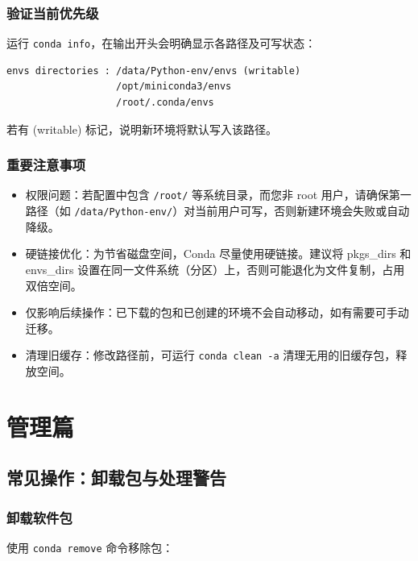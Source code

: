 \documentclass[12pt,UTF8]{ctexbook}
\begin{document}
\section{验证当前优先级}
\label{sec:verify_priority}

运行 \texttt{conda info}，在输出开头会明确显示各路径及可写状态：

\begin{lstlisting}
envs directories : /data/Python-env/envs (writable)
                   /opt/miniconda3/envs
                   /root/.conda/envs
\end{lstlisting}

若有 (writable) 标记，说明新环境将默认写入该路径。

\section{重要注意事项}
\label{sec:important_notes}

\begin{itemize}[leftmargin=2cm]
    \item 权限问题：若配置中包含 \texttt{/root/} 等系统目录，而您非 root 用户，请确保第一路径（如 \texttt{/data/Python-env/}）对当前用户可写，否则新建环境会失败或自动降级。
    \item 硬链接优化：为节省磁盘空间，Conda 尽量使用硬链接。建议将 pkgs\_dirs 和 envs\_dirs 设置在同一文件系统（分区）上，否则可能退化为文件复制，占用双倍空间。
    \item 仅影响后续操作：已下载的包和已创建的环境不会自动移动，如有需要可手动迁移。
    \item 清理旧缓存：修改路径前，可运行 \texttt{conda clean -a} 清理无用的旧缓存包，释放空间。
\end{itemize}

\part{管理篇}

\chapter{常见操作：卸载包与处理警告}
\label{chap:management}

\section{卸载软件包}
\label{sec:uninstall_package}

使用 \texttt{conda remove} 命令移除包：
\end{document}
